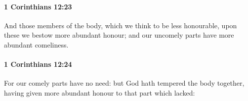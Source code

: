 		\paragraph{1 Corinthians 12:23} %
			\label{1CORINTHIANS-12-23}

			And those members of the body, which we think to be less honourable, upon these we bestow more abundant honour; and our uncomely parts have more abundant comeliness.

			\begin{framed}
				\scriptsize
				\begin{compactdesc}
					\item[SBLG] 
				\end{compactdesc}
			\end{framed}

		\paragraph{1 Corinthians 12:24} %
			\label{1CORINTHIANS-12-24}

			For our comely parts have no need: but God hath tempered the body together, having given more abundant honour to that part which lacked:

